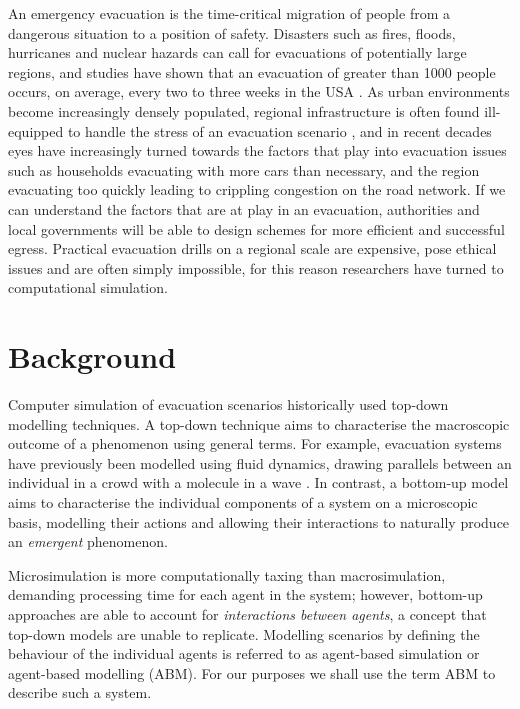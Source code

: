 An emergency evacuation is the time-critical migration of people from a dangerous situation to a position of safety. Disasters such as fires, floods, hurricanes and nuclear hazards can call for evacuations of potentially large regions, and studies have shown that an evacuation of greater than 1000 people occurs, on average, every two to three weeks in the USA \cite{SandiaNationalLaboratories2005IdentificationEvacuations,Murray-Tuite2013EvacuationPractice}. As urban environments become increasingly densely populated, regional infrastructure is often found ill-equipped to handle the stress of an evacuation scenario \cite{Pitt2008TheFloods}, and in recent decades eyes have increasingly turned towards the factors that play into evacuation issues \cite{Dow2002EmergingCarolina} such as households evacuating with more cars than necessary, and the region evacuating too quickly leading to crippling congestion on the road network. If we can understand the factors that are at play in an evacuation, authorities and local governments will be able to design schemes for more efficient and successful egress. Practical evacuation drills on a regional scale are expensive, pose ethical issues and are often simply impossible, for this reason researchers have turned to computational simulation. 

\section{Background}
Computer simulation of evacuation scenarios historically used top-down modelling techniques. A top-down technique aims to characterise the macroscopic outcome of a phenomenon using general terms. For example, evacuation systems have previously been modelled using fluid dynamics, drawing parallels between an individual in a crowd with a molecule in a wave \cite{Thompson1995APopulations}.
In contrast, a bottom-up model aims to characterise the individual components of a system on a microscopic basis, modelling their actions and allowing their interactions to naturally produce an \textit{emergent} phenomenon. 

Microsimulation is more computationally taxing than macrosimulation, demanding processing time for each agent in the system; however, bottom-up approaches are able to account for \textit{interactions between agents}, a concept that top-down models are unable to replicate. Modelling scenarios by defining the behaviour of the individual agents is referred to as agent-based simulation or agent-based modelling (ABM). For our purposes we shall use the term ABM to describe such a system.

